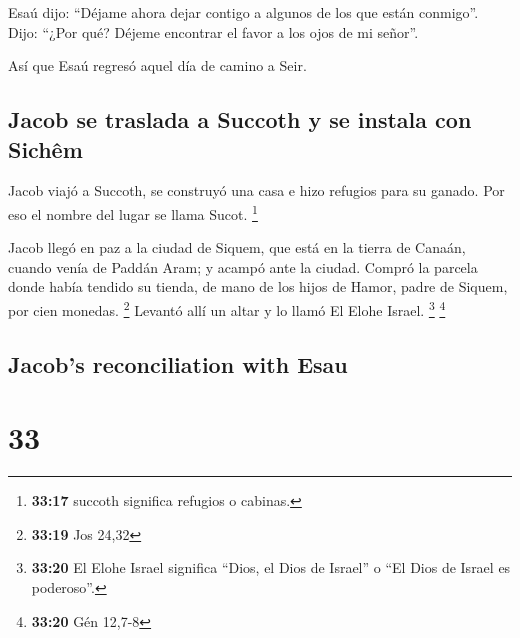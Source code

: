 \begin{paracol}{2}
 Esaú dijo: ``Déjame ahora dejar contigo a algunos de los
que están conmigo''. Dijo: ``¿Por qué? Déjeme encontrar el favor a los
ojos de mi señor''.

 Así que Esaú regresó aquel día de camino a Seir.

\hypertarget{jacob-se-traslada-a-succoth-y-se-instala-con-sichuxeam}{%
\subsection{Jacob se traslada a Succoth y se instala con
Sichêm}\label{jacob-se-traslada-a-succoth-y-se-instala-con-sichuxeam}}

 Jacob viajó a Succoth, se construyó una casa e hizo
refugios para su ganado. Por eso el nombre del lugar se llama Sucot.
\footnote{\textbf{33:17} succoth significa refugios o cabinas.}

 Jacob llegó en paz a la ciudad de Siquem, que está en la
tierra de Canaán, cuando venía de Paddán Aram; y acampó ante la ciudad.
 Compró la parcela donde había tendido su tienda, de mano
de los hijos de Hamor, padre de Siquem, por cien monedas. \footnote{\textbf{33:19}
  Jos 24,32}  Levantó allí un altar y lo llamó El Elohe
Israel. \footnote{\textbf{33:20} El Elohe Israel significa ``Dios, el
  Dios de Israel'' o ``El Dios de Israel es poderoso''.} \footnote{\textbf{33:20}
  Gén 12,7-8}

\switchcolumn
\begin{otherlanguage}{english}

\hypertarget{jacobs-reconciliation-with-esau}{%
\subsection{Jacob's reconciliation with
Esau}\label{jacobs-reconciliation-with-esau}}

\hypertarget{section-65}{%
\section{33}\label{section-65}}


\end{otherlanguage}
\end{paracol}
